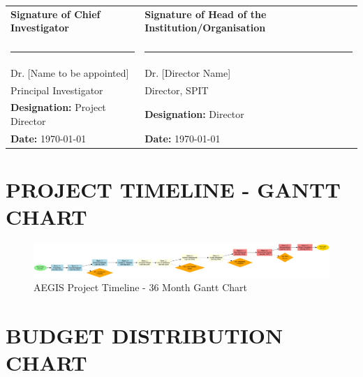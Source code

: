 \documentclass[12pt,a4paper]{article}
\begin{document}
\vspace{2cm}

\begin{table}[H]
\centering
\begin{tabular}{p{6cm}p{6cm}}

\textbf{Signature of Chief Investigator} & \textbf{Signature of Head of the Institution/Organisation} \\
\vspace{3cm} & \vspace{3cm} \\
\hrule & \hrule \\
Dr. [Name to be appointed] & Dr. [Director Name] \\
Principal Investigator & Director, SPIT \\
\textbf{Designation:} Project Director & \textbf{Designation:} Director \\
\textbf{Date:} \today & \textbf{Date:} \today \\

\end{tabular}
\end{table}

\newpage

\section{PROJECT TIMELINE - GANTT CHART}

\begin{figure}[H]
\centering
\includegraphics[width=\textwidth]{diagrams/gantt_timeline.png}
\caption{AEGIS Project Timeline - 36 Month Gantt Chart}
\label{fig:gantt}
\end{figure}

\section{BUDGET DISTRIBUTION CHART}
\end{document}
